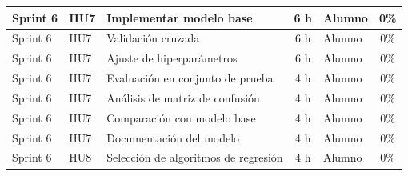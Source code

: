 \documentclass[
11pt, %
]{charter}
\begin{document}
\begin{table}[htpb]
\begin{tabularx}{\linewidth}{@{}|l|l|X|c|l|c|@{}}
Sprint 6 & HU7 & Implementar modelo base & 6 h & Alumno & 0\% \\ \hline
Sprint 6 & HU7 & Validación cruzada & 6 h & Alumno & 0\% \\ \hline
Sprint 6 & HU7 & Ajuste de hiperparámetros & 6 h & Alumno & 0\% \\ \hline
Sprint 6 & HU7 & Evaluación en conjunto de prueba & 4 h & Alumno & 0\% \\ \hline
Sprint 6 & HU7 & Análisis de matriz de confusión & 4 h & Alumno & 0\% \\ \hline
Sprint 6 & HU7 & Comparación con modelo base & 4 h & Alumno & 0\% \\ \hline
Sprint 6 & HU7 & Documentación del modelo & 4 h & Alumno & 0\% \\ \hline
Sprint 6 & HU8 & Selección de algoritmos de regresión & 4 h & Alumno & 0\% \\ \hline

\end{tabularx}
\end{table}
\end{document}
